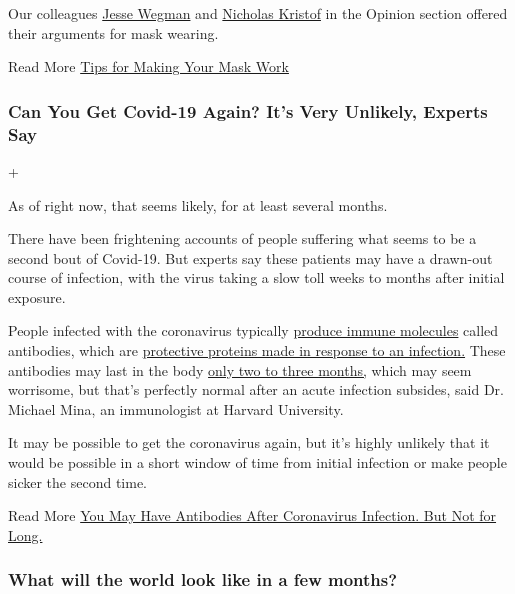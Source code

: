 Our colleagues
\href{https://www.nytimes.com/2020/07/02/opinion/coronavirus-masks.html}{Jesse
Wegman} and
\href{https://www.nytimes.com/2020/07/01/opinion/coronavirus-face-masks.html?action=click\&module=RelatedLinks\&pgtype=Article}{Nicholas
Kristof} in the Opinion section offered their arguments for mask
wearing.

 Read More
\href{https://www.nytimes.com/interactive/2020/06/25/burst/how-to-get-the-most-out-of-your-mask.html}{Tips
for Making Your Mask Work}

\hypertarget{can-you-get-covid-19-again-its-very-unlikely-experts-say}{%
\subsubsection{Can You Get Covid-19 Again? It's Very Unlikely, Experts
Say}\label{can-you-get-covid-19-again-its-very-unlikely-experts-say}}

+

As of right now, that seems likely, for at least several months.

There have been frightening accounts of people suffering what seems to
be a second bout of Covid-19. But experts say these patients may have a
drawn-out course of infection, with the virus taking a slow toll weeks
to months after initial exposure.

People infected with the coronavirus typically
\href{https://www.nature.com/articles/s41586-020-2456-9}{produce immune
molecules} called antibodies, which are
\href{https://www.nytimes.com/2020/05/07/health/coronavirus-antibody-prevalence.html}{protective
proteins made in response to an infection.} These antibodies may last in
the body \href{https://www.nature.com/articles/s41591-020-0965-6}{only
two to three months,} which may seem worrisome, but that's perfectly
normal after an acute infection subsides, said Dr. Michael Mina, an
immunologist at Harvard University.

It may be possible to get the coronavirus again, but it's highly
unlikely that it would be possible in a short window of time from
initial infection or make people sicker the second time.

 Read More
\href{https://www.nytimes.com/2020/07/22/health/covid-antibodies-herd-immunity.html}{You
May Have Antibodies After Coronavirus Infection. But Not for Long.}

\hypertarget{what-will-the-world-look-like-in-a-few-months}{%
\subsubsection{What will the world look like in a few
months?}\label{what-will-the-world-look-like-in-a-few-months}}

